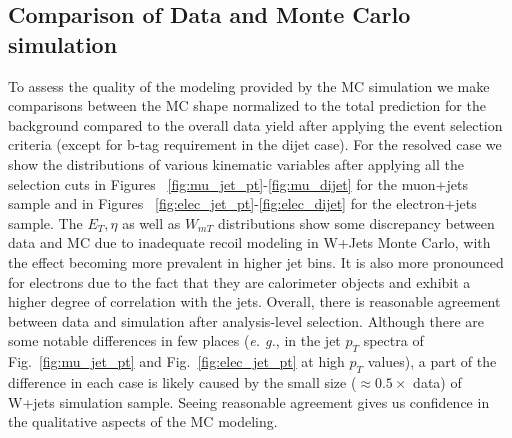 \subsection{Comparison of Data and Monte Carlo simulation}
To assess the quality of the modeling provided by the MC simulation we 
make comparisons between the MC shape normalized to the total
prediction for the background compared to the overall data
yield after applying the event selection criteria (except for b-tag requirement in the dijet case). 
For the resolved case we show the distributions of various kinematic
variables after applying all the selection cuts in 
Figures ~\ref{fig:mu_jet_pt}-\ref{fig:mu_dijet}
for the muon+jets sample and in 
Figures ~\ref{fig:elec_jet_pt}-\ref{fig:elec_dijet} for
the electron+jets sample. The $E_T,\eta$ as well as $W_{mT}$ distributions show some discrepancy between data and MC due to inadequate recoil modeling in W+Jets Monte Carlo, with the effect becoming more prevalent in higher jet bins. It is also more pronounced for electrons due to the fact that they are calorimeter objects and exhibit a higher degree of correlation with the jets.
Overall, there is reasonable agreement between data and simulation 
after analysis-level selection.
Although there are some notable differences in few places 
(\textit{e. g.}, in the jet $p_T$ spectra of Fig.~\ref{fig:mu_jet_pt} 
and Fig.~\ref{fig:elec_jet_pt} at high $p_T$ values),  
a part of the difference in each case 
is likely caused by the small size ($\approx 0.5 \times$ data)
of W+jets simulation sample. 
Seeing reasonable agreement gives us confidence in
the qualitative aspects of the MC modeling.

